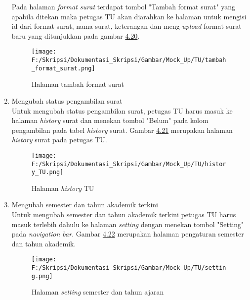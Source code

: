 \begin{enumerate}
	Pada halaman \textit{format surat} terdapat tombol "Tambah format surat" yang apabila ditekan maka petugas TU akan diarahkan ke halaman untuk mengisi id dari format surat, nama surat, keterangan dan meng-\textit{upload} format surat baru yang ditunjukkan pada gambar \hyperlink{halaman_tambah_format_surat}{4.20}.
	\begin{figure}[H]
	\centering
		\texttt{[image: F:/Skripsi/Dokumentasi\_Skripsi/Gambar/Mock\_Up/TU/tambah\_format\_surat.png]}
		\caption{Halaman tambah format surat}
		\label{fig:halaman_tambah_format_surat}
	\end{figure}
	
	\item Mengubah status pengambilan surat\\
	Untuk mengubah status pengambilan surat, petugas TU harus masuk ke halaman \textit{history} surat dan menekan tombol "Belum" pada kolom pengambilan pada tabel \textit{history} surat. Gambar \hyperlink{halaman_history_TU}{4.21} merupakan halaman \textit{history} surat pada petugas TU.
	\begin{figure}[H]
	\centering
		\texttt{[image: F:/Skripsi/Dokumentasi\_Skripsi/Gambar/Mock\_Up/TU/history\_TU.png]}
		\caption{Halaman \textit{history} TU}
		\label{fig:halaman_history_TU}
	\end{figure}
	
	\item Mengubah semester dan tahun akademik terkini \\
	Untuk mengubah semester dan tahun akademik terkini petugas TU harus masuk terlebih dahulu ke halaman \textit{setting} dengan menekan tombol "Setting" pada \textit{navigation bar}. Gambar \hyperlink{setting}{4.22} merupakan halaman pengaturan semester dan tahun akademik.
	\begin{figure}[H]
	\centering
		\texttt{[image: F:/Skripsi/Dokumentasi\_Skripsi/Gambar/Mock\_Up/TU/setting.png]}
		\caption{Halaman \textit{setting} semester dan tahun ajaran}
		\label{fig:setting}
	\end{figure}
\end{enumerate}
